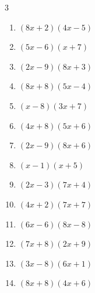 \begin{multicols}{3}
\begin{enumerate}

  \item $(8x+2)(4x-5)$


  \item $(5x-6)(x+7)$


  \item $(2x-9)(8x+3)$


  \item $(8x+8)(5x-4)$


  \item $(x-8)(3x+7)$


  \item $(4x+8)(5x+6)$


  \item $(2x-9)(8x+6)$


  \item $(x-1)(x+5)$


  \item $(2x-3)(7x+4)$


  \item $(4x+2)(7x+7)$


  \item $(6x-6)(8x-8)$


  \item $(7x+8)(2x+9)$


  \item $(3x-8)(6x+1)$


  \item $(8x+8)(4x+6)$


\columnbreak %


\end{enumerate}
\end{multicols}
